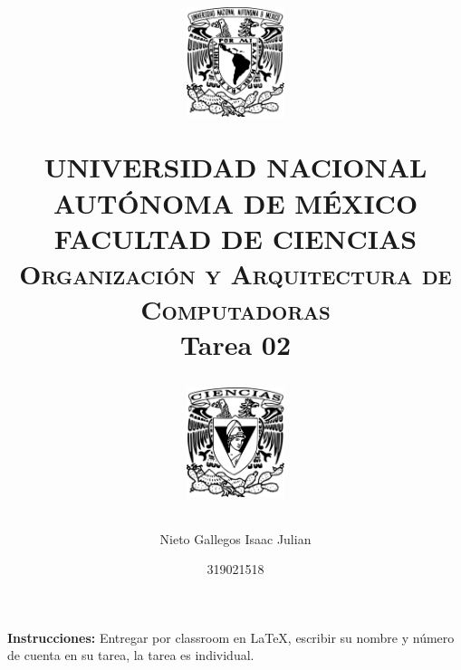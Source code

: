 \documentclass[12pt,letterpaper]{article}
\title{
		\vspace{-0.7in} 	
		\usefont{OT1}{bch}{b}{n}
		\begin{minipage}{3cm}
        \vspace{-0.5in} 	
    	\begin{center}
    		\includegraphics[height=3.2cm]{logo_unam.png}
    	\end{center}
    \end{minipage}\hfill
    \begin{minipage}{10.7cm}
    
    	\begin{center}
\normalfont \normalsize \textsc{UNIVERSIDAD NACIONAL AUTÓNOMA DE MÉXICO \\ FACULTAD DE CIENCIAS \\ Organización y Arquitectura de Computadoras } \\
		\huge Tarea 02
    	\end{center}
     
    \end{minipage}\hfill
    \begin{minipage}{3.2cm}
    \vspace{-0.5in} 
    	\begin{center}
    		\includegraphics[height=3.2cm]{logo_fc.png}
    	\end{center}
    \end{minipage}

\author{Nieto Gallegos Isaac Julian}
\date{319021518}
}
\begin{document}
\maketitle

\textbf{Instrucciones:} Entregar por classroom en \LaTeX, escribir su nombre y número de cuenta en su tarea, la tarea es individual.\\

% 

\end{document}
